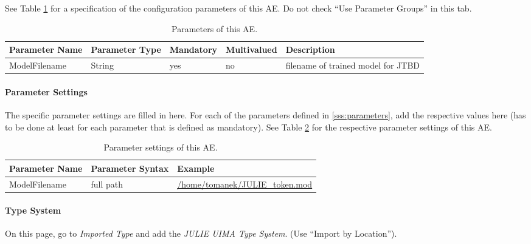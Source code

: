 \documentclass[11pt,a4paper,halfparskip]{scrartcl}
\begin{document}
See Table \ref{tab:parameters} for a specification of the
configuration parameters of this AE. Do not check ``Use Parameter
Groups'' in this tab.

\begin{table}[h!]
  \centering
  \begin{tabular}{|p{4cm}|p{2cm}|p{2cm}|p{2cm}|p{4cm}|}
    \hline
    Parameter Name & Parameter Type & Mandatory & Multivalued & Description \\
    \hline\hline
    ModelFilename & String & yes & no & filename of trained model for
    JTBD\\
    \hline
  \end{tabular}
  \caption{Parameters of this AE.}
  \label{tab:parameters}
\end{table}


\paragraph{Parameter Settings}
\label{sss:param_settings}

The specific parameter settings are filled in here. For each of the
parameters defined in \ref{sss:parameters}, add the respective values
here (has to be done at least for each parameter that is defined as
mandatory). See Table \ref{tab:param_settings} for the respective
parameter settings of this AE.

\begin{table}[h!]
  \centering
  \begin{tabular}{|p{4cm}|p{4cm}|p{7cm}|}
    \hline
    Parameter Name & Parameter Syntax & Example \\
    \hline\hline
    ModelFilename & full path & \url{/home/tomanek/JULIE_token.mod}\\
    \hline
  \end{tabular}
  \caption{Parameter settings of this AE.}
  \label{tab:param_settings}
\end{table}

\paragraph{Type System}
\label{sss:type_system}
On this page, go to \emph{Imported Type} and add the \emph{JULIE UIMA
  Type System}. (Use ``Import by Location'').
\end{document}
